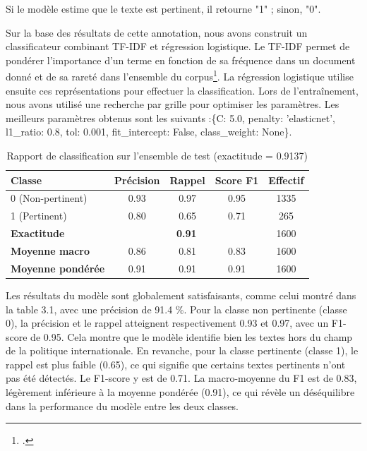 \documentclass[a4paper,twoside,12pt]{book}
\begin{document}
Si le modèle estime que le texte est pertinent, il retourne "1" ; sinon, "0".

Sur la base des résultats de cette annotation, nous avons construit un classificateur combinant TF-IDF et régression logistique. Le TF-IDF permet de pondérer l'importance d'un terme en fonction de sa fréquence dans un document donné et de sa rareté dans l'ensemble du corpus\footcite{ramos2003}. La régression logistique utilise ensuite ces représentations pour effectuer la classification. Lors de l'entraînement, nous avons utilisé une recherche par grille pour optimiser les paramètres. Les meilleurs paramètres obtenus sont les suivants :\{C: 5.0, penalty: 'elasticnet', l1\_ratio: 0.8, tol: 0.001, fit\_intercept: False, class\_weight: None\}.





\begin{table}[ht]
\centering
\begin{tabular}{lcccc}
\hline
Classe & Précision & Rappel & Score F1 & Effectif \\
\hline
0 (Non-pertinent) & 0.93 & 0.97 & 0.95 & 1335 \\
1 (Pertinent)     & 0.80 & 0.65 & 0.71 & 265 \\
\hline
\textbf{Exactitude} & \multicolumn{3}{c}{\textbf{0.91}} & 1600 \\
\textbf{Moyenne macro} & 0.86 & 0.81 & 0.83 & 1600 \\
\textbf{Moyenne pondérée} & 0.91 & 0.91 & 0.91 & 1600 \\
\hline
\end{tabular}
\caption{Rapport de classification sur l'ensemble de test (exactitude = 0.9137)}
\label{tab:classification_report}
\end{table}

Les résultats du modèle sont globalement satisfaisants, comme celui montré dans la table 3.1, avec une précision de 91.4 \%. Pour la classe non pertinente (classe 0), la précision et le rappel atteignent respectivement 0.93 et 0.97, avec un F1-score de 0.95. Cela montre que le modèle identifie bien les textes hors du champ de la politique internationale. En revanche, pour la classe pertinente (classe 1), le rappel est plus faible (0.65), ce qui signifie que certains textes pertinents n'ont pas été détectés. Le F1-score y est de 0.71. La macro-moyenne du F1 est de 0.83, légèrement inférieure à la moyenne pondérée (0.91), ce qui révèle un déséquilibre dans la performance du modèle entre les deux classes.
\end{document}
